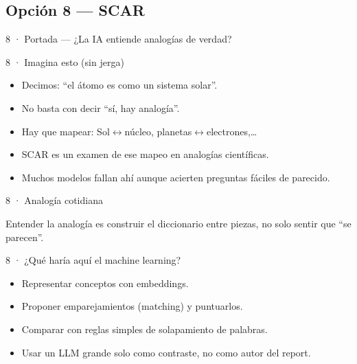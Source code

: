 \subsection{Opción 8 --- SCAR}

\begin{frame}{8 · Portada --- ¿La IA entiende analogías de verdad?}
\end{frame}

\begin{frame}{8 · Imagina esto (sin jerga)}
  \begin{itemize}
    \item Decimos: ``el átomo es como un sistema solar''.
    \item No basta con decir ``sí, hay analogía''.
    \item Hay que mapear: Sol$\leftrightarrow$núcleo, planetas$\leftrightarrow$electrones,\ldots
    \item SCAR es un examen de ese mapeo en analogías científicas.
    \item Muchos modelos fallan ahí aunque acierten preguntas fáciles de parecido.
  \end{itemize}
\end{frame}

\begin{frame}{8 · Analogía cotidiana}
  \begin{center}
  \end{center}
  \vspace{0.35em}
  Entender la analogía es construir el diccionario entre piezas, no solo sentir que ``se parecen''.
\end{frame}

\begin{frame}{8 · ¿Qué haría aquí el machine learning?}
  \begin{itemize}
    \item Representar conceptos con embeddings.
    \item Proponer emparejamientos (matching) y puntuarlos.
    \item Comparar con reglas simples de solapamiento de palabras.
    \item Usar un LLM grande solo como contraste, no como autor del report.
  \end{itemize}
\end{frame}

